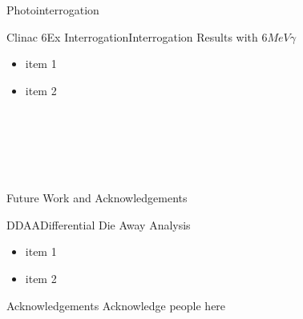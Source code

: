 \begin{col}{6}{12}
  \begin{cell}{6}{8}{Photointerrogation}{}
    \begin{col}{2}{8}
      \begin{cell}{2}{5}{Clinac 6Ex Interrogation}{Interrogation Results with $6 MeV \gamma$}
        \begin{itemize}
          \item item 1
          \item item 2
        \end{itemize}
      \end{cell} \\
      \vspace*{\fill}
      \begin{cell}{2}{3}{}{}
      \end{cell}
    \end{col}%
    \begin{col}{4}{8}
      \begin{cell}{4}{3}{}{}
      \end{cell} \\
      \vspace*{\fill}
      \begin{cell}{4}{5}{}{}
      \end{cell}
    \end{col}%
  \end{cell}
  \\
  \begin{cell}{6}{4}{Future Work and Acknowledgements}{}
    \begin{cell}{3}{4}{DDAA}{Differential Die Away Analysis}
      \begin{itemize}
        \item item 1
        \item item 2
      \end{itemize}
    \end{cell}%
    \hspace*{\fill}
    \begin{cell}{3}{4}{Acknowledgements}{}
      Acknowledge people here
    \end{cell}
  \end{cell}%
\end{col}%

